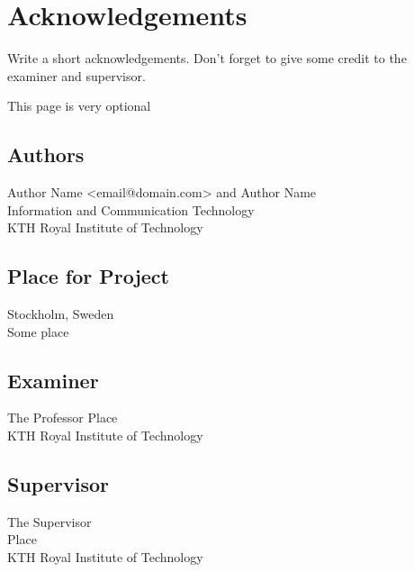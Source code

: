 \newpage
\section*{Acknowledgements}
Write a short acknowledgements. Don't forget to give some credit to the examiner and supervisor.






\newpage
\thispagestyle{empty}
This page is very optional
~\\
\vfill
{ 
	\subsection*{Authors}
	Author Name <email@domain.com> and Author Name\\
	Information and Communication Technology\\
	KTH Royal Institute of Technology
	
	\subsection*{Place for Project}
	Stockholm, Sweden\\
	Some place
	
	\subsection*{Examiner}
	The Professor
	Place \\
	KTH Royal Institute of Technology
	
	\subsection*{Supervisor }
	The Supervisor\\
	Place\\
	KTH Royal Institute of Technology
	~
	
}


